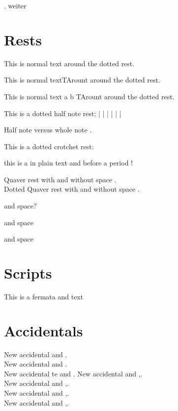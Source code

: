 \documentclass{scrartcl}
\begin{document}
\newcommand{\lilyRFZtest}[1][]{%
    \mbox{%
        \lilyDynamics[#1]{r\hspace{0.035ex}fz}%
    }%
}

\lilyRFZ*. \lilyRFZ weiter

\section*{Rests}

This is normal text  \lilyDot around the dotted rest.

This is normal text\halfNoteRest TArount around the dotted rest.


This is normal text \halfNoteRestDotted* \lilyPrintMoreDots* a \lilyPrintMoreDots b 
TArount around the dotted rest.

This is a dotted half note rest:
\halfNoteRestDotted*[scale=0.5]|
\halfNoteRestDotted*[scale=1]|
\halfNoteRestDotted*[scale=1.5]|
\halfNoteRestDotted*[scale=2]|
\halfNoteRestDotted*[scale=3.5]|
\halfNoteRestDotted*[scale=5]|

Half note \halfNoteRest versus whole note \wholeNoteRestDotted*[scale=2].


This is a dotted crotchet rest: 
\crotchetRestDotted[scale=0.5] 
\crotchetRestDotted[scale=1]
\crotchetRestDotted[scale=1.5]
\crotchetRestDotted[scale=2]
\crotchetRestDotted[scale=3.5]
\crotchetRestDotted[scale=5]

this is a \crotchetRest in plain text and before a period \crotchetRest* !



Quaver rest \quaverRest with \semiquaverRest and without space \semiquaverRest*.\\
Dotted Quaver rest with \semiquaverRestDotted and without space \semiquaverRestDotted*.

 and space?

\lilyRFZ and space

 and space

\section*{Scripts}

This is a fermata \fermata* and text

\section*{Accidentals}
New \sharp accidental \sharpArrowdown and \sharpArrowdown*.\\
New \sharp accidental \sharpArrowup and \sharpArrowup*.\\
New \sharp accidental te \sharpArrowboth and \sharpArrowboth*.
New accidental \sharpSlashslashStem and \sharpSlashslashStem*,.\\
New accidental \sharpSlashslashslashStemstem and \sharpSlashslashslashStemstem*,.\\
New accidental \sharpSlashslashslashStem and \sharpSlashslashslashStem*,.\\
New accidental \sharpSlashslashStemstemstem and \sharpSlashslashStemstemstem*,.\\
\end{document}
